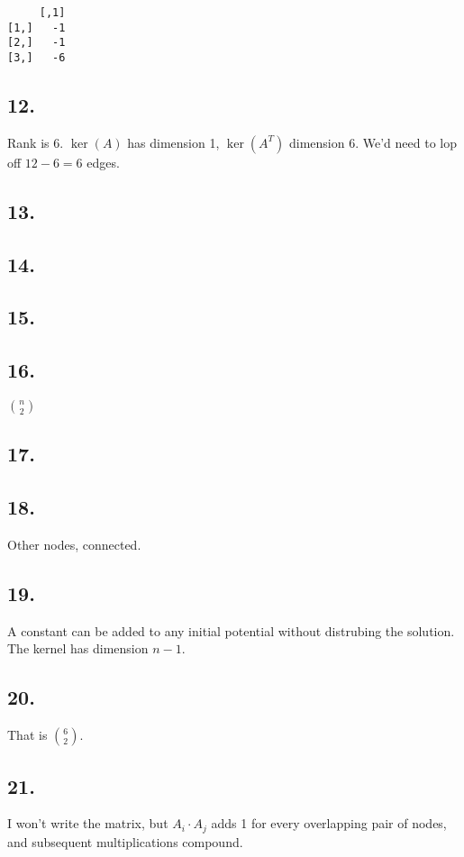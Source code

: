 \documentclass[]{article}
\begin{document}
\begin{verbatim}
     [,1]
[1,]   -1
[2,]   -1
[3,]   -6
\end{verbatim}

\hypertarget{section-11}{%
\subsection{12.}\label{section-11}}

Rank is 6. \(\ker(A)\) has dimension 1, \(\ker(A^T)\) dimension 6. We'd
need to lop off \(12-6 = 6\) edges.

\hypertarget{section-12}{%
\subsection{13.}\label{section-12}}

\hypertarget{section-13}{%
\subsection{14.}\label{section-13}}

\hypertarget{section-14}{%
\subsection{15.}\label{section-14}}

\hypertarget{section-15}{%
\subsection{16.}\label{section-15}}

\(n \choose 2\)

\hypertarget{section-16}{%
\subsection{17.}\label{section-16}}

\hypertarget{section-17}{%
\subsection{18.}\label{section-17}}

Other nodes, connected.

\hypertarget{section-18}{%
\subsection{19.}\label{section-18}}

A constant can be added to any initial potential without distrubing the
solution. The kernel has dimension \(n-1\).

\hypertarget{section-19}{%
\subsection{20.}\label{section-19}}

That is \(6 \choose 2\).

\hypertarget{section-20}{%
\subsection{21.}\label{section-20}}

I won't write the matrix, but \(A_i \cdot A_j\) adds 1 for every
overlapping pair of nodes, and subsequent multiplications compound.
\end{document}
